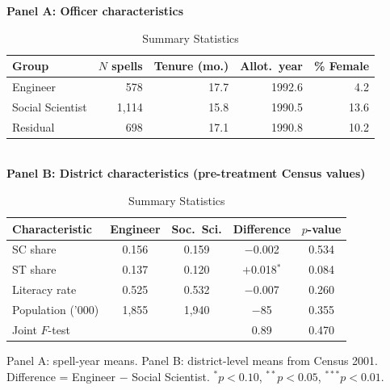 \begin{table}[htbp]
\centering
\caption{Summary Statistics}
\label{tab:summary}
\textbf{Panel A: Officer characteristics}\\[4pt]
\begin{tabular}{lrrrr}
\toprule
Group & $N$ spells & Tenure (mo.) & Allot.\ year & \% Female \\
\midrule
Engineer         & 578   & 17.7 & 1992.6 &  4.2 \\
Social Scientist & 1,114 & 15.8 & 1990.5 & 13.6 \\
Residual         & 698   & 17.1 & 1990.8 & 10.2 \\
\bottomrule
\end{tabular}
\\[10pt]
\textbf{Panel B: District characteristics (pre-treatment Census values)}\\[4pt]
\begin{tabular}{lcccc}
\toprule
Characteristic      & Engineer & Soc.\ Sci. & Difference & $p$-value \\
\midrule
SC share            & 0.156 & 0.159 & $-$0.002  & 0.534 \\
ST share            & 0.137 & 0.120 & $+$0.018$^{*}$ & 0.084 \\
Literacy rate       & 0.525 & 0.532 & $-$0.007  & 0.260 \\
Population ('000)   & 1,855 & 1,940 & $-$85     & 0.355 \\
\midrule
Joint $F$-test      &       &       & 0.89      & 0.470 \\
\bottomrule
\end{tabular}
\par\vspace{4pt}
{\footnotesize Panel A: spell-year means. Panel B: district-level means from Census 2001.
Difference = Engineer $-$ Social Scientist. $^{*}p<0.10$, $^{**}p<0.05$, $^{***}p<0.01$.}
\end{table}

